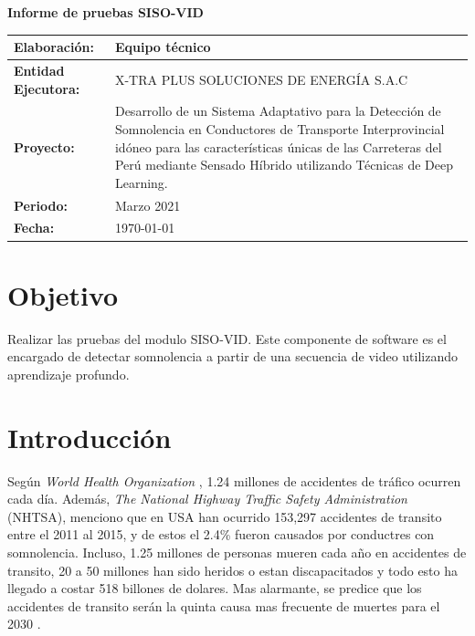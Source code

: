 \documentclass{article}
\begin{document}
	
	\begin{center}	
		\fontsize{15}{15} \textbf{Informe de pruebas SISO-VID}
	\end{center}
	
	\begin{table}[h]
		\setlength{\tabcolsep}{0.5em} %
		{\renewcommand{\arraystretch}{1.6}%
			\begin{tabular}{|p{4cm}|p{10.8cm}|}
				\hline 
				\textbf{Elaboración:} & Equipo técnico  \\	\hline 
				\textbf{Entidad Ejecutora:} & X-TRA PLUS SOLUCIONES DE ENERGÍA S.A.C  \\	\hline 
				\textbf{Proyecto:} & Desarrollo de un Sistema Adaptativo para la Detección de Somnolencia en Conductores de Transporte Interprovincial idóneo para las características únicas de las Carreteras del Perú mediante Sensado Híbrido utilizando Técnicas de Deep Learning.  \\	\hline 
				\textbf{Periodo:} & Marzo 2021  \\	\hline 
				\textbf{Fecha:} & \today  \\	\hline 
			\end{tabular}
		}
	\end{table}	
	
	
	
	\section{Objetivo}
	
	Realizar las pruebas del modulo SISO-VID. Este componente de software es el encargado de detectar somnolencia a partir de una secuencia de video utilizando aprendizaje profundo.
	
	\section{Introducción}
	
	Según \textit{World Health Organization} \cite{who}, 1.24 millones de accidentes de tráfico ocurren cada día. Además, \textit{The National Highway Traffic Safety Administration} (NHTSA), menciono que en USA han ocurrido 153,297 accidentes de transito entre el 2011 al 2015, y de estos el 2.4\%  fueron causados por conductres con somnolencia. Incluso, 1.25 millones de personas mueren cada año en accidentes de transito, 20 a 50 millones han sido heridos o estan discapacitados y todo esto ha llegado a costar 518 billones de dolares. Mas alarmante, se predice que los accidentes de transito serán la quinta causa mas frecuente de muertes para el 2030 \citep{asirt}. \\	
	
\end{document}
